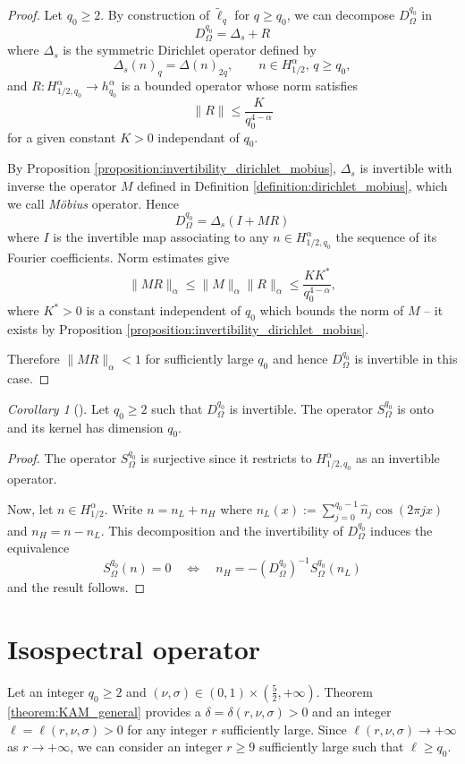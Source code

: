 \documentclass[12pt, openany]{amsart}
\theoremstyle{definition}
\theoremstyle{remark}
\theoremstyle{remark}
\theoremstyle{theorem}
\theoremstyle{theorem}
\theoremstyle{theorem}
\theoremstyle{theorem}
\newtheorem{corollary}[theorem]{Corollary}
\begin{document}
\begin{proof}
Let $q_0\geq 2$. By construction of $\tilde\ell_q$ for $q\geq q_0$, we can decompose $D_{\Omega}^{q_0}$ in 
\[
D_{\Omega}^{q_0} = \Delta_s+R
\]
where $\Delta_s$ is the symmetric Dirichlet operator defined by
\[
\Delta_s(n)_q = \Delta(n)_{2q},\qquad n\in H^{\alpha}_{1/2},\, q\geq q_0,
\]
and $R:H^{\alpha}_{1/2,q_0}\to h^{\alpha}_{q_0}$ is a bounded operator whose norm satisfies
\[
\|R\|\leq \frac{K}{q_0^{4-\alpha}}
\]
for a given constant $K>0$ independant of $q_0$.

By Proposition \ref{proposition:invertibility_dirichlet_mobius}, $\Delta_s$ is invertible with inverse the operator $M$ defined in Definition \ref{definition:dirichlet_mobius}, which we call \textit{Möbius} operator. Hence
\[
D_{\Omega}^{q_0} = \Delta_s(I+MR)
\]
where $I$ is the invertible map associating to any $n\in H^{\alpha}_{1/2,q_0}$ the sequence of its Fourier coefficients. Norm estimates give
\[
\|MR\|_{\alpha}\leq \|M\|_{\alpha}\|R\|_{\alpha}\leq \frac{KK^{\ast}}{q_0^{4-\alpha}},
\]
where $K^{\ast}>0$ is a constant independent of $q_0$ which bounds the norm of $M$ -- it exists by Proposition \ref{proposition:invertibility_dirichlet_mobius}. 

Therefore $\|MR\|_{\alpha}<1$ for sufficiently large $q_0$ and hence $D_{\Omega}^{q_0}$ is invertible in this case.
\end{proof}

\begin{corollary}[\cite{DKW}]
\label{proposition:dimension_DKW}
Let $q_0\geq 2$ such that $D_{\Omega}^{q_0}$ is invertible. The operator $S_{\Omega}^{q_0}$ is onto and its kernel has dimension $q_0$.
\end{corollary}

\begin{proof}
The operator $S_{\Omega}^{q_0}$ is surjective since it restricts to $H^{\alpha}_{1/2,q_0}$ as an invertible operator.

Now, let $n\in H^{\alpha}_{1/2}$. Write $n = n_L+n_H$ where $n_L(x):=\sum_{j=0}^{q_0-1}\widehat n_j\cos(2\pi jx)$ and $n_H=n-n_L$. This decomposition and the invertibility of $D_{\Omega}^{q_0}$ induces the equivalence
\[
S_{\Omega}^{q_0}(n) = 0
\quad
\Leftrightarrow
\quad
n_H = -(D_{\Omega}^{q_0})^{-1}S_{\Omega}^{q_0}(n_L)
\]
and the result follows.
\end{proof}


\section{Isospectral operator}
\label{section:isospectral_operator}
Let an integer $q_0\geq 2$ and $(\nu,\sigma)\in(0,1)\times(\frac{5}{2},+\infty)$. Theorem \ref{theorem:KAM_general} provides a $\delta=\delta(r,\nu,\sigma)>0$ and an integer $\ell = \ell(r,\nu,\sigma)>0$ for any integer $r$ sufficiently large. Since $\ell(r,\nu,\sigma)\to+\infty$ as $r\to+\infty$, we can consider an integer $r\geq 9$ sufficiently large such that $\ell\geq q_0$.
\end{document}
